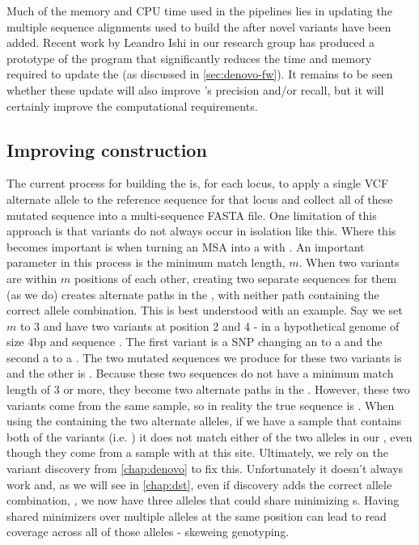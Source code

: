 Much of the memory and CPU time used in the \pandora{} pipelines lies in updating the multiple sequence alignments used to build the \prg{} after novel variants have been added. Recent work by Leandro Ishi in our research group has produced a prototype of the \makeprg{} program that significantly reduces the time and memory required to update the \prg{} (as discussed in \autoref{sec:denovo-fw}). It remains to be seen whether these update will also improve \pandora{}'s precision and/or recall, but it will certainly improve the computational requirements. 

\subsection{Improving \prg{} construction}
\label{sec:improve-prg}
The current process for building the \mtb{} \prg{} is, for each locus, to apply a single VCF alternate allele to the reference sequence for that locus and collect all of these mutated sequence into a multi-sequence FASTA file. One limitation of this approach is that variants do not always occur in isolation like this. Where this becomes important is when turning an MSA into a \prg{} with \makeprg{}. An important parameter in this process is the minimum match length, $m$. When two variants are within $m$ positions of each other, creating two separate sequences for them (as we do) creates alternate paths in the \prg{}, with neither path containing the correct allele combination. This is best understood with an example. Say we set $m$ to 3 and have two variants at position 2 and 4 - in a hypothetical genome of size 4bp and sequence . The first variant is a SNP changing an  to a  and the second a  to a . The two mutated sequences we produce for these two variants is  and the other is . Because these two sequences do not have a minimum match length of 3 or more, they become two alternate paths in the \prg{}. However, these two variants come from the same sample, so in reality the true sequence is . When using the \prg{} containing the two alternate alleles, if we have a sample that contains both of the variants (i.e. ) it does not match either of the two alleles in our \prg{}, even though they come from a sample with  at this site. Ultimately, we rely on the \denovo{} variant discovery from \autoref{chap:denovo} to fix this. Unfortunately it doesn't always work and, as we will see in \autoref{chap:dst}, even if \denovo{} discovery adds the correct allele combination, , we now have three alleles that could share minimizing \kmer{}s. Having shared minimizers over multiple alleles at the same position can lead to read coverage across all of those alleles - skeweing genotyping. 

